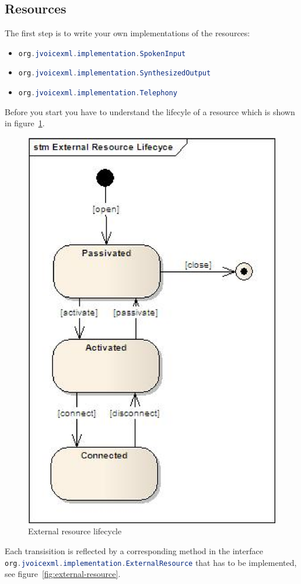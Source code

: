 \documentclass[11pt,a4paper]{article}
\begin{document}
\subsection{Resources}

The first step is to write your own implementations of the resources:
\begin{itemize}
  \item \lstinline[language=Java]{org.jvoicexml.implementation.SpokenInput}
  \item
  \lstinline[language=Java]{org.jvoicexml.implementation.SynthesizedOutput}
  \item \lstinline[language=Java]{org.jvoicexml.implementation.Telephony}
\end{itemize}

Before you start you have to understand the lifecyle of a resource which is
shown in figure~\ref{fig:external-resource-lifecycle}.
\begin{figure}[htp]
\begin{center}
  \includegraphics[width=0.4\linewidth]{stm-external-resource-lifecycle}
  \caption{External resource lifecycle}
  \label{fig:external-resource-lifecycle}
\end{center}
\end{figure}
Each transisition is reflected by a corresponding method in the interface
\lstinline[language=Java]{org.jvoicexml.implementation.ExternalResource}
that has to be implemented, see figure~\ref{fig:external-resource}.
\end{document}
